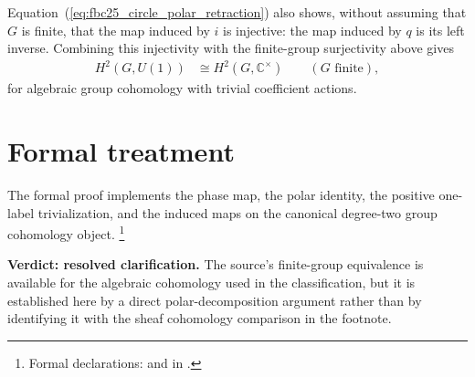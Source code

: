 \documentclass{article}
\begin{document}
Equation~(\ref{eq:fbc25_circle_polar_retraction}) also shows, without assuming
that $G$ is finite, that the map induced by $i$ is injective: the map induced
by $q$ is its left inverse.  Combining this injectivity with the finite-group
surjectivity above gives
\begin{align}
    H^2(G,U(1))
     & \cong H^2(G,\mathbb C^\times)
    \qquad (G\text{ finite}),
    \label{eq:fbc25_circle_h2_equivalence}
\end{align}
for algebraic group cohomology with trivial coefficient actions.

\section{Formal treatment}

The formal proof implements the phase map, the polar identity, the positive
one-label trivialization, and the induced maps on the canonical degree-two
group cohomology object.
\footnote{Formal declarations:
    and  in
    .}

\textbf{Verdict: resolved clarification.}
The source's finite-group equivalence is available for the algebraic
cohomology used in the classification, but it is established here by a direct
polar-decomposition argument rather than by identifying it with the sheaf
cohomology comparison in the footnote.



\end{document}
